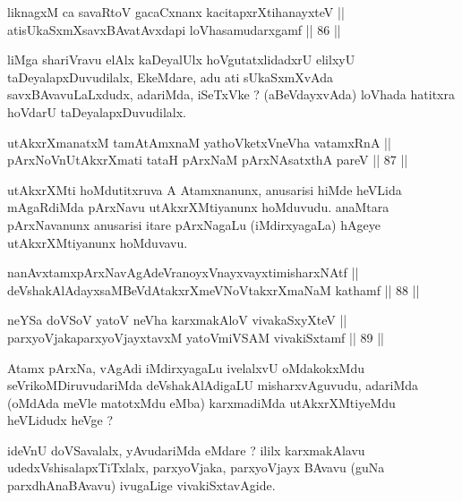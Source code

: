 \begin{shl}
liknagxM ca savaRtoV gacaCxnanx kacitapxrXtihanayxteV || \\
atisUkaSxmXsavxBAvatAvxdapi loVhasamudarxgamf \hfill || 86 ||  
\end{shl}

\begin{artha}
liMga shariVravu elAlx kaDeyalUlx hoVgutatxlidadxrU elilxyU
taDeyalapxDuvudilalx, EkeMdare, adu ati sUkaSxmXvAda
savxBAvavuLaLxdudx, adariMda, iSeTxVke ? (aBeVdayxvAda) loVhada
hatitxra hoVdarU taDeyalapxDuvudilalx.
\end{artha}


\begin{shl}
utAkxrXmanatxM tamAtAmxnaM yathoVketxVneVha vatamxRnA || \\
pArxNoV\s nUtAkxrXmati tataH pArxNaM pArxNAsatxthA pareV \hfill || 87 ||  
\end{shl}

\begin{artha}
utAkxrXMti hoMdutitxruva A Atamxnanunx, anusarisi hiMde heVLida
mAgaRdiMda pArxNavu utAkxrXMtiyanunx hoMduvudu. anaMtara pArxNavanunx
anusarisi itare pArxNagaLu (iMdirxyagaLa) hAgeye utAkxrXMtiyanunx hoMduvavu.
\end{artha}


\begin{shl}
nanAvxtamxpArxNavAgAdeVranoyxVnayxvayxtimisharxNAtf || \\
deVshakAlAdayxsaMBeVdAtakxrXmeVNoVtakxrXmaNaM kathamf \hfill || 88 || 
\end{shl}

\begin{shl}
neYSa doVSoV yatoV neVha karxmakAloV vivakaSxyXteV || \\
parxyoVjakaparxyoVjayxtavxM yatoV\s miVSAM vivakiSxtamf \hfill || 89 ||  
\end{shl}

\begin{artha}
Atamx pArxNa, vAgAdi iMdirxyagaLu ivelalxvU oMdakokxMdu
seVrikoMDiruvudariMda deVshakAlAdigaLU misharxvAguvudu, adariMda
(oMdAda meVle matotxMdu eMba) karxmadiMda utAkxrXMtiyeMdu heVLidudx
heVge ?
\end{artha}

\begin{artha}
ideVnU doVSavalalx, yAvudariMda eMdare ? ililx karxmakAlavu
udedxVshisalapxTiTxlalx, parxyoVjaka, parxyoVjayx BAvavu (guNa
parxdhAnaBAvavu) ivugaLige vivakiSxtavAgide.
\end{artha}

